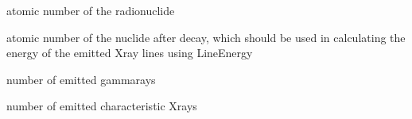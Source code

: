 \documentclass[letterpaper,10pt,english,openany,oneside]{sphinxmanual}
\begin{document}
\begin{fulllineitems}
\begin{fulllineitems}
\label{\detokenize{api/radionuclides:dxraylib.xraylib_radionuclides.radioNuclideData.Z}}
\pysigstartsignatures
{}
\pysigstopsignatures
\sphinxAtStartPar
atomic number of the radionuclide

\end{fulllineitems}


\begin{fulllineitems}
\label{\detokenize{api/radionuclides:dxraylib.xraylib_radionuclides.radioNuclideData.Z_xray}}
\pysigstartsignatures
{}
\pysigstopsignatures
\sphinxAtStartPar
atomic number of the nuclide after decay, which should be used in
calculating the energy of the emitted X\sphinxhyphen{}ray lines using LineEnergy

\end{fulllineitems}


\begin{fulllineitems}
\label{\detokenize{api/radionuclides:dxraylib.xraylib_radionuclides.radioNuclideData.nGammas}}
\pysigstartsignatures
{}
\pysigstopsignatures
\sphinxAtStartPar
number of emitted gamma\sphinxhyphen{}rays

\end{fulllineitems}


\begin{fulllineitems}
\label{\detokenize{api/radionuclides:dxraylib.xraylib_radionuclides.radioNuclideData.nXrays}}
\pysigstartsignatures
{}
\pysigstopsignatures
\sphinxAtStartPar
number of emitted characteristic X\sphinxhyphen{}rays


\end{fulllineitems}
\end{fulllineitems}
\end{document}
